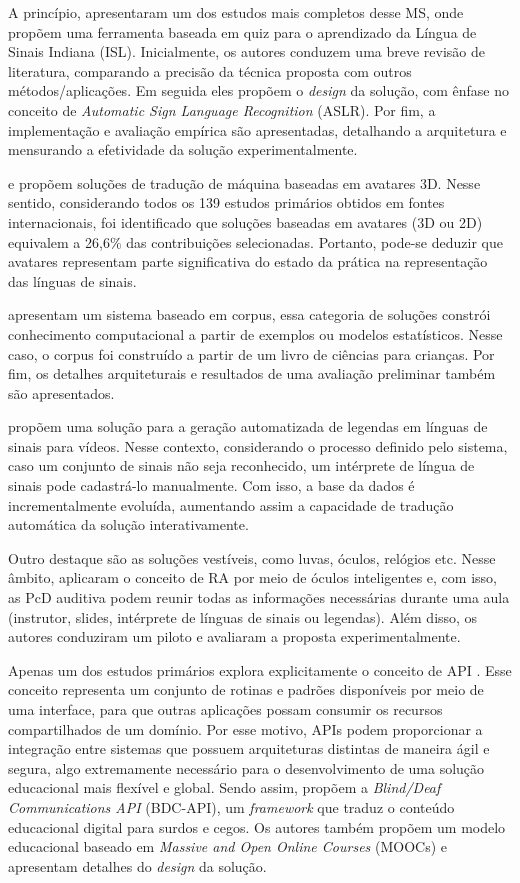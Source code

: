 A  princípio,  apresentaram um dos estudos mais completos desse MS, onde propõem uma ferramenta baseada em quiz para o aprendizado da Língua de Sinais Indiana (ISL). Inicialmente, os autores conduzem uma breve revisão de literatura, comparando a precisão da técnica proposta com outros métodos/aplicações. Em seguida eles propõem o \textit{design} da solução, com ênfase no conceito de \textit{Automatic Sign Language Recognition} (ASLR). Por fim, a implementação e avaliação empírica são apresentadas, detalhando a arquitetura e mensurando a efetividade da solução experimentalmente.

 e  propõem soluções de tradução de máquina baseadas em avatares 3D. Nesse sentido, considerando todos os 139 estudos primários obtidos em fontes internacionais, foi identificado que soluções baseadas em avatares (3D ou 2D) equivalem a 26,6\% das contribuições selecionadas. Portanto, pode-se deduzir que avatares representam parte significativa do estado da prática na representação das línguas de sinais.

 apresentam um sistema baseado em corpus, essa categoria de soluções constrói conhecimento computacional a partir de exemplos ou modelos estatísticos. Nesse caso, o corpus foi construído a partir de um livro de ciências para crianças. Por fim, os detalhes arquiteturais e resultados de uma avaliação preliminar também são apresentados.

 propõem uma solução para a geração automatizada de legendas em línguas de sinais para vídeos. Nesse contexto, considerando o processo definido pelo sistema, caso um conjunto de sinais não seja reconhecido, um intérprete de língua de sinais pode cadastrá-lo manualmente. Com isso, a base da dados é incrementalmente evoluída, aumentando assim a capacidade de tradução automática da solução interativamente.

Outro destaque são as soluções vestíveis, como luvas, óculos, relógios etc. Nesse âmbito,  aplicaram o conceito de RA por meio de óculos inteligentes e, com isso, as PcD auditiva podem reunir todas as informações necessárias durante uma aula (instrutor, slides, intérprete de línguas de sinais ou legendas). Além disso, os autores conduziram um piloto e avaliaram a proposta experimentalmente.

Apenas um dos estudos primários explora explicitamente o conceito de API \cite{INT56}. Esse conceito representa um conjunto de rotinas e padrões disponíveis por meio de uma interface, para que outras aplicações possam consumir os recursos compartilhados de um domínio. Por esse motivo, APIs podem proporcionar a integração entre sistemas que possuem arquiteturas distintas de maneira ágil e segura, algo extremamente necessário para o desenvolvimento de uma solução educacional mais flexível e global. Sendo assim,  propõem a \textit{Blind/Deaf Communications API} (BDC-API), um \textit{framework} que traduz o conteúdo educacional digital para surdos e cegos. Os autores também propõem um modelo educacional baseado em \textit{Massive and Open Online Courses} (MOOCs) e apresentam detalhes do \textit{design} da solução.

